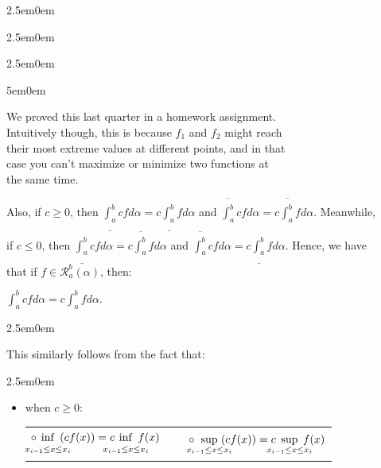 \documentclass{book}
\newcommand{\hThree}{%
   \color{PineGreen!85!Orange}
   \fontsize{13}{15}\selectfont%
}
\newcommand{\hFour}{%
   \color{Cerulean}
   \fontsize{12}{14}\selectfont%
}
\newenvironment{myIndent}{%
   \begin{adjustwidth}{2.5em}{0em}%
}{%
   \end{adjustwidth}%
}
\newenvironment{myDindent}{%
   \begin{adjustwidth}{5em}{0em}%
}{%
   \end{adjustwidth}%
}
\newcommand{\retTwo}{\hfill\bigbreak}
\begin{document}
{\begin{myIndent}
\begin{enumerate}
{\begin{myIndent}
\begin{myIndent}
            \begin{myDindent}\hFour
               We proved this last quarter in a homework assignment.\\ Intuitively though, this is because  $f_1$ and $f_2$ might reach\\ their most extreme values at different points, and in that\\ case you can't maximize or minimize two functions at\\ the same time.\retTwo
            \end{myDindent}
         \end{myIndent}
      \end{myIndent}}

      Also, if $c \geq 0$, then $\underline{\int_a^b}cfd\alpha = c\underline{\int_a^b}fd\alpha$ and $\overline{\int_a^b}cfd\alpha = c\overline{\int_a^b}fd\alpha$. Meanwhile,\\ [-4pt] if $c \leq 0$, then $\underline{\int_a^b}cfd\alpha = c\overline{\int_a^b}fd\alpha$ and $\overline{\int_a^b}cfd\alpha = c\underline{\int_a^b}fd\alpha$. Hence, we have\\ [2pt] that if $f \in \mathscr{R}_a^b(\alpha)$, then:

      {\centering $\int_a^bcfd\alpha = c\int_a^bfd\alpha$. \retTwo\par}

      {\begin{myIndent}\hThree
         This similarly follows from the fact that:
         \begin{myIndent}
            \begin{itemize}
               \item when $c \geq 0$:
               
               \begin{tabular}{c c c}
                  $\circ\hspace{-1.2em}\inf\limits_{x_{i-1}\vphantom{\int^b} \leq x \leq x_i}\hspace{-1em}(cf(x)) = c\hspace{-1.22em}\inf\limits_{x_{i-1} \leq\vphantom{\int^b} x \leq x_i}\hspace{-1.15em}f(x)$ & $\phantom{a}$ &

                  $\circ\hspace{-0.9em}\sup\limits_{x_{i-1} \leq x \leq x_i}\hspace{-1em}(cf(x)) = c\hspace{-1em}\sup\limits_{x_{i-1} \leq x \leq x_i}\hspace{-1em}f(x)$
               \end{tabular}\\


\end{itemize}
\end{myIndent}
\end{myIndent}}
\end{enumerate}
\end{myIndent}}
\end{document}
